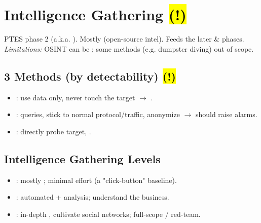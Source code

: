 

\section{Intelligence Gathering \hl{(!)}}
PTES phase 2 (a.k.a. ). Mostly  (open-source intel). Feeds the later  \&  phases.
\textit{Limitations:} OSINT can be ; some methods (e.g. dumpster diving) out of scope.

\subsection{3 Methods (by detectability) \hl{(!)}}
\begin{itemize}
\item {}: use  data only, never touch the target $\to$ . 
\item {}:  queries, stick to normal protocol/traffic, anonymize $\to$ should  raise alarms. 
\item {}: directly probe target, . 
\end{itemize}

\subsection{Intelligence Gathering Levels}
\begin{itemize}
\item {}: mostly ; minimal effort (a "click-button" baseline).
\item {}: automated +  analysis; understand the business.
\item {}: in-depth , cultivate social networks; full-scope / red-team.
\end{itemize}

